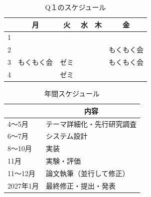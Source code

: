 \documentclass[a4paper,12pt]{ujarticle}
\newcommand{\thc}[1]{\multicolumn{1}{c|}{#1}}
\begin{document}
\begin{table}[H]
  \caption{Q１のスケジュール}\label{tab:studyschedule}
  \centering
  \begin{tabular}{|p{4mm}||p{30mm}|p{30mm}|p{30mm}|p{30mm}|p{30mm}|}\hline
        & \thc{月} & \thc{火} & \thc{水} & \thc{木} & \thc{金} \\ \hline\hline
     1  &     &     &     &  &   \\ \hline
     2  &     &  &  &  & もくもく会\\ \hline
     3  & もくもく会  & ゼミ &  & &もくもく会  \\ \hline
     4  &  & ゼミ & &  & \\ \hline
  \end{tabular}
\end{table}

\begin{table}[H]
  \caption{年間スケジュール}\label{tab:yearlyschedule}
  \centering
  \begin{tabular}{|p{30mm}||p{30mm}|}\hline
        & \thc{内容} \\ \hline\hline
     4～5月  & テーマ詳細化・先行研究調査 \\ \hline
     6～7月  & システム設計 \\ \hline
     8～10月  & 実装 \\ \hline
     11月  & 実験・評価 \\ \hline
     11～12月  & 論文執筆（並行して修正） \\ \hline
     2027年1月  & 最終修正・提出・発表 \\ \hline
  \end{tabular}
\end{table}
\end{document}
